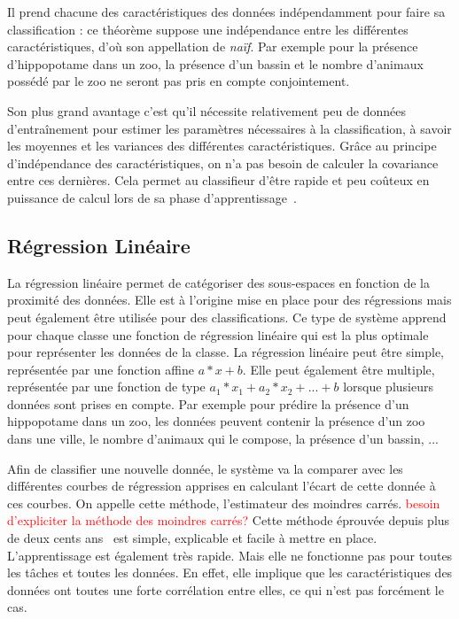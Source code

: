 Il prend chacune des caractéristiques des données indépendamment pour faire sa classification : ce théorème suppose une indépendance entre les différentes caractéristiques, d'où son appellation de \textit{naïf}. Par exemple pour la présence d'hippopotame dans un zoo, la présence d'un bassin et le nombre d'animaux possédé par le zoo ne seront pas pris en compte conjointement.

Son plus grand avantage c'est qu'il nécessite relativement peu de données d'entraînement pour estimer les paramètres nécessaires à la classification, à savoir les moyennes et les variances des différentes caractéristiques. Grâce au principe d'indépendance des caractéristiques, on n'a pas besoin de calculer la covariance entre ces dernières. Cela permet au classifieur d'être rapide et peu coûteux en puissance de calcul lors de sa phase d'apprentissage~\cite{Hand2001}.

\subsection{Régression Linéaire}
La régression linéaire permet de catégoriser des sous-espaces en fonction de la proximité des données. Elle est à l'origine mise en place pour des régressions mais peut également être utilisée pour des classifications. Ce type de système apprend pour chaque classe une fonction de régression linéaire qui est la plus optimale pour représenter les données de la classe. La régression linéaire peut être simple, représentée par une fonction affine $a*x+b$.
Elle peut également être multiple, représentée par une fonction de type $a_1*x_1 + a_2*x_2 +... + b$ lorsque plusieurs données sont prises en compte. Par exemple pour prédire la présence d'un hippopotame dans un zoo, les données peuvent contenir la présence d'un zoo dans une ville, le nombre d'animaux qui le compose, la présence d'un bassin, ...

Afin de classifier une nouvelle donnée, le système va la comparer avec les différentes courbes de régression apprises en calculant l'écart de cette donnée à ces courbes. On appelle cette méthode, l'estimateur des moindres carrés.
\textcolor{red}{besoin d'expliciter la méthode des moindres carrés?}
Cette méthode éprouvée depuis plus de deux cents ans~\cite{Gauss1809,Legendre1805,Adrain1808} est simple, explicable et facile à mettre en place.  L'apprentissage est également très rapide. Mais elle ne fonctionne pas pour toutes les tâches et toutes les données. En effet, elle implique que les caractéristiques des données ont toutes une forte corrélation entre elles, ce qui n'est pas forcément le cas.

